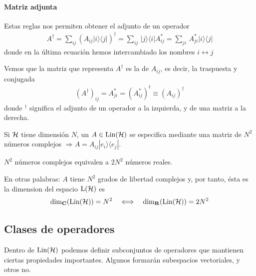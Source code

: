 \documentclass[letterpaper,10pt,english]{jupyterBook}
\newcommand{\bra}[1]{\langle #1|}
\newcommand{\ket}[1]{|#1\rangle}
\newcommand{\ketbra}[2]{| #1\rangle \langle #2 |}
\newcommand{\Hil}{{\cal H}}
\newcommand{\Lin}{\hbox{Lin}}
\begin{document}
\paragraph{Matriz adjunta}
\label{\detokenize{docs/Part_01_Formalismo/Chapter_01_02_Formalismo_matem_xe1tico/01_03_Operadores_myst:matriz-adjunta}}
\sphinxAtStartPar
Estas reglas nos permiten obtener el adjunto de un operador
\begin{equation*}
\begin{split}
A^\dagger = \sum_{ij}\left( A_{ij}\ketbra{i}{j}\right)^\dagger = \sum_{ij} \, \ketbra{j}{i}A_{ij}^* =  \sum_{ji} \, A_{ji}^*\ketbra{i}{j}
\end{split}
\end{equation*}
\sphinxAtStartPar
donde en la última ecuación hemos intercambiado los nombres \(i\leftrightarrow j\)

\sphinxAtStartPar
Vemos que la matriz que representa \(A^\dagger\) es la  de \(A_{ij}\), es decir, la traspuesta y conjugada
\begin{equation*}
\begin{split}
(A^\dagger)_{ij} = A^*_{ji} = (A^{*}_{ij})^t \equiv (A_{ij})^\dagger
\end{split}
\end{equation*}
\sphinxAtStartPar
donde \(^\dagger\) significa el adjunto de un operador a la izquierda, y de una matriz a la derecha.

\sphinxAtStartPar
Si \(\Hil\) tiene dimensión \(N\), un  \(A\in \Lin(\Hil)\) se especifica mediante una matriz de \(N^2\) números complejos \(\Rightarrow A = A_{ij}\ket{e_i}\bra{e_j}\).

\sphinxAtStartPar
\(N^2\) números complejos equivalen a \(2N^2\) números reales.

\sphinxAtStartPar
En otras palabras: \(A\)  tiene \(N^2\) grados de libertad complejos y, por tanto, ésta es la dimension del espacio \({\rm L}(\Hil)\) es
\begin{equation*}
\begin{split} {\rm dim}_{\bf C}(\Lin(\Hil)) = N^2 ~~~ \Longleftrightarrow ~~~ {\rm dim}_{\bf R}(\Lin(\Hil)) =  2N^2
\end{split}
\end{equation*}

\subsection{Clases de operadores}
\label{\detokenize{docs/Part_01_Formalismo/Chapter_01_02_Formalismo_matem_xe1tico/01_03_Operadores_myst:clases-de-operadores}}
\sphinxAtStartPar
Dentro de \(\Lin(\Hil)\) podemos definir subconjuntos de operadores que mantienen ciertas propiedades importantes. Algunos formarán subespacios vectoriales, y otros no.
\end{document}
